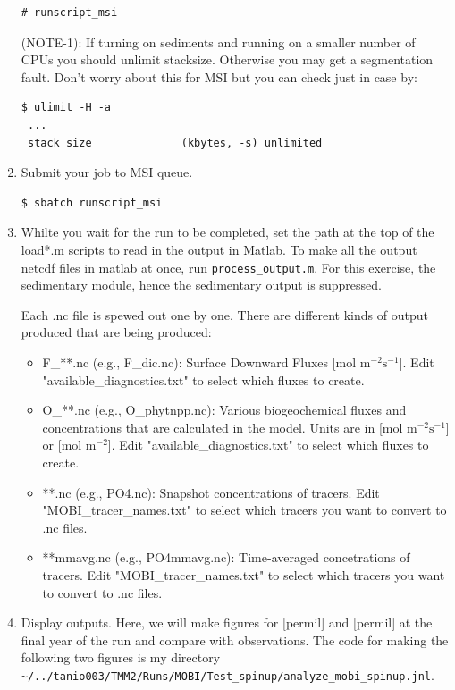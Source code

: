 \documentclass[a4paper]{article}
\def\noin{\noindent }
\begin{document}
\begin{enumerate}
\lstset{language=sh} 
\begin{lstlisting}[frame=single,basicstyle=\scriptsize,commentstyle=\color{blue}]
 # runscript_msi
\end{lstlisting}
\noin (NOTE-1): If turning on sediments and running on a smaller number of CPUs you should unlimit stacksize. Otherwise you may get a segmentation fault. Don't worry about this for MSI but you can check just in case by:
\begin{lstlisting}[style=DOS]
 $ ulimit -H -a
 ...
 stack size              (kbytes, -s) unlimited
\end{lstlisting}

\item Submit your job to MSI queue.
\begin{lstlisting}[style=DOS]
 $ sbatch runscript_msi
\end{lstlisting}

\item Whilte you wait for the run to be completed, set the path at the top of the load*.m scripts to read in the output in Matlab. To make all the output netcdf files in matlab at once, run \verb|process_output.m|. For this exercise, the sedimentary module, hence the sedimentary output is suppressed. 

\noin Each .nc file is spewed out one by one. There are different kinds of output produced that are being produced:
\begin{itemize}
 \item F\_**.nc (e.g., F\_dic.nc): Surface Downward Fluxes [mol $\mathrm{m^{-2} s^{-1}}$]. Edit "available\_diagnostics.txt" to select which fluxes to create.
 \item O\_**.nc (e.g., O\_phytnpp.nc): Various biogeochemical fluxes and concentrations that are calculated in the model. Units are in [mol $\mathrm{m^{-2} s^{-1}}$] or [mol $\mathrm{m^{-2}}$]. Edit "available\_diagnostics.txt" to select which fluxes to create.
 \item **.nc (e.g., PO4.nc): Snapshot concentrations of tracers. Edit "MOBI\_tracer\_names.txt" to select which tracers you want to convert to .nc files.
 \item **mmavg.nc (e.g., PO4mmavg.nc): Time-averaged concetrations of tracers. Edit "MOBI\_tracer\_names.txt" to select which tracers you want to convert to .nc files.
\end{itemize}

\item Display outputs. Here, we will make figures for \Delta{} [permil] and \delta{} [permil] at the final year of the run and compare with observations. The code for making the following two figures is my directory \verb|~/../tanio003/TMM2/Runs/MOBI/Test_spinup/analyze_mobi_spinup.jnl|.


\end{enumerate}
\end{document}
